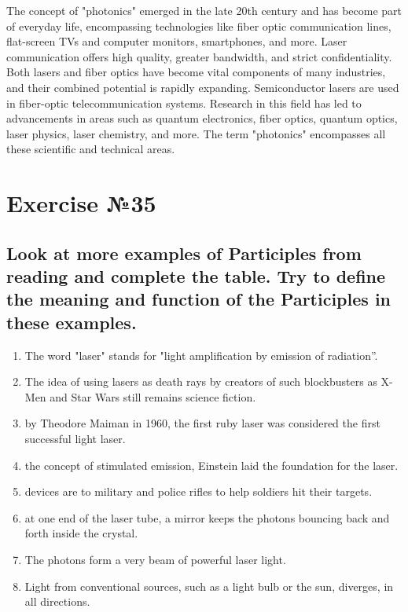 The concept of "photonics" emerged in the late 20th century and has become part of
everyday life, encompassing technologies like fiber optic communication lines,
flat-screen TVs and computer monitors, smartphones, and more. Laser communication
offers high quality, greater bandwidth, and strict confidentiality. Both lasers and
fiber optics have become vital components of many industries, and their combined
potential is rapidly expanding. Semiconductor lasers are used in fiber-optic
telecommunication systems. Research in this field has led to advancements in areas
such as quantum electronics, fiber optics, quantum optics, laser physics, laser
chemistry, and more. The term "photonics" encompasses all these scientific and
technical areas.

\section*{Exercise №35}
\subsection*{Look at more examples of Participles from reading and complete the table. Try to define
      the meaning and function of the Participles in these examples.}
\begin{enumerate}
      \item The word "laser" stands for "light amplification by  emission of radiation”.
      \item The idea of using lasers as death rays  by creators of such blockbusters as X-Men
            and Star Wars still remains science fiction.
      \item {} by Theodore Maiman in 1960, the first ruby laser was considered
            the first successful light laser.
      \item {} the concept of stimulated emission, Einstein laid the foundation for the
            laser.
      \item {} devices are  to military and police rifles to help soldiers hit their targets.
      \item {} at one end of the laser tube, a mirror keeps the photons bouncing back and
            forth inside the crystal.
      \item The  photons form a very  beam of powerful laser light.
      \item Light from conventional sources, such as a light bulb or the sun, diverges,  in all
            directions.
\end{enumerate}

